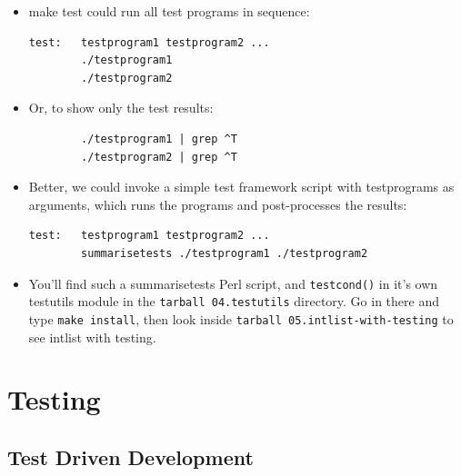 \documentclass[aspectratio=169]{beamer}
\newcommand{\pitem}{\pause \item}
\begin{document}
\begin{frame}[fragile]
    \begin{itemize}
      \item
      \alert{make test} could run all test programs in sequence:
\begin{verbatim}
test:   testprogram1 testprogram2 ...
        ./testprogram1
        ./testprogram2
\end{verbatim}

      \item
      Or, to show only the test results:
\begin{verbatim}
        ./testprogram1 | grep ^T
        ./testprogram2 | grep ^T
\end{verbatim}

      \pitem
      Better, we could invoke a simple
      test framework script with testprograms as arguments,
      which runs the programs and post-processes the results:

\begin{verbatim}
test:   testprogram1 testprogram2 ...
        summarisetests ./testprogram1 ./testprogram2
\end{verbatim}

      \item
      You'll find such a \alert{summarisetests} Perl script,
      and \verb+testcond()+ in it's own \alert{testutils} module
      in the \verb+tarball 04.testutils+ directory.  Go in there and type
      \verb+make install+, then look inside \verb+tarball 05.intlist-with-testing+ to see
      \alert{intlist} with testing.

    \end{itemize}
\end{frame}

\section{Testing}
\subsection{Test Driven Development}
\end{document}
